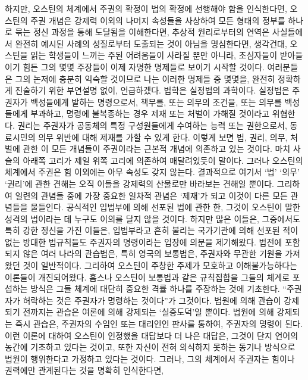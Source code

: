 하지만, 오스틴의 체계에서 주권의 확정이 법의 확정에 선행해야 함을
인식한다면,
오스틴의 주권 개념은
강제력 이외의 나머지 속성들을 사상하여
모든 형태의 정부를 하나로 묶는 정신 과정을 통해 도달됨을
이해한다면,
추상적 원리로부터의 연역은
사실들에서
완전히
예시된 사례의 성질로부터 도출되는 것이 아님을
명심한다면,
생각건대,
오스틴을 읽는 학생들이 느끼는 주된 어려움들이 사라질 뿐만 아니라,
초심자들이 받아들이기 힘든 그의 몇몇 주장들이 이제 자명한 명제들로
보이기 시작할 것이다.
여러분들은 그의 논저에 충분히 익숙할 것이므로
나는 이러한 명제들 중 몇몇을, 완전히 정확하게 진술하기 위한 부연설명 없이,
언급하겠다.
법학은 실정법의 과학이다.
실정법은 주권자가 백성들에게 발하는 명령으로서,
책무를, 또는 의무의 조건을, 또는 의무를 백성들에게 부과하고,
명령에 불복종하는 경우 제재 또는 처벌이 가해질 것이라고 위협한다.
권리는 주권자가 공동체의 특정 구성원들에게 수여하는 능력 또는 권한으로서,
동료시민의 의무 위반에 대해 제재를 가할 수 있게 한다.
이렇게 보면 법, 권리, 의무, 처벌에 관한 이 모든 개념들이
주권이라는 근본적 개념에 의존하고 있는 것이다.
마치 사슬의 아래쪽 고리가 제일 위쪽 고리에 의존하여 매달려있듯이 말이다.
그러나 오스틴의 체계에서 주권은 힘 이외에는 아무 속성도 갖지 않는다.
결과적으로 여기서 `법' `의무' `권리'에 관한 견해는 오직
이들을 강제력의 산물로만 바라보는 견해일 뿐이다.
그리하여 일련의 관념들 중에 가장 중요한 일차적 관념은 `제재'가 되고 이것이
다른 모든 관념들을 물들인다.
공식적인 입법부에 의해 선포된 법에 관한 한,
그것이 오스틴이 말한 성격의 법이라는 데 누구도 이의를 달지 않을 것이다.
하지만 많은 이들은, 그중에서도 특히 강한 정신을 가진 이들은,
입법부라고 흔히 불리는 국가기관에 의해 선포된 적이 없는 방대한 법규칙들도
주권자의 명령이라는 입장에 의문을 제기해왔다.
법전에 포함되지 않은 여러 나라의 관습법은,
특히 영국의 보통법은,
주권자와 무관한 기원을 가져왔던 것이 일반적이다.
그리하여 오스틴이 주창한 주제가 모호하고 이해불가능하다는 이론들이 개진되어왔다.
홉스나 오스틴이 보통법과 같은 규칙집합을 그들의 체계로 포섭하는 방식은
그들 체계에 대단히 중요한 격률 하나를 주장하는 것에 기초한다.
``주권자가 허락하는 것은 주권자가 명령하는 것이다''가 그것이다.
법원에 의해 관습이 강제되기 전까지는
관습은 여론에 의해 강제되는 `실증도덕'일 뿐이다.
법원에 의해 강제되는 즉시 관습은,
주권자의 수임인 또는 대리인인 판사를 통하여,
주권자의 명령이 된다.
이런 이론에 대하여 오스틴이 인정했을 대답보다 더 나은 대답은,
그것이 단지 언어의 농간에 기초하고 있다는 것이고, 또한
자신이 전혀 의식하지 못하는 동기나 방식으로 법원이 행위한다고
가정하고 있다는 것이다.
그러나,
그의 체계에서 주권자는 힘이나 권력에만 관계된다는 것을 명확히 인식한다면,
